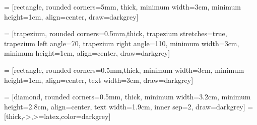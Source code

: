  = [rectangle, rounded corners=5mm, thick,
minimum width=3cm, 
minimum height=1cm,
align=center, 
draw=darkgrey]

 = [trapezium, rounded corners=0.5mm,thick,
trapezium stretches=true, %
trapezium left angle=70, 
trapezium right angle=110, 
minimum width=3cm, 
minimum height=1cm, 
align=center, 
draw=darkgrey]

 = [rectangle, rounded corners=0.5mm,thick,
minimum width=3cm, 
minimum height=1cm, 
align=center, 
text width=3cm, 
draw=darkgrey]

 = [diamond, rounded corners=0.5mm, thick,
minimum width=3.2cm, 
minimum height=2.8cm, 
align=center, 
text width=1.9cm,
inner sep=2,
draw=darkgrey]
 = [thick,->,>=latex,color=darkgrey]


